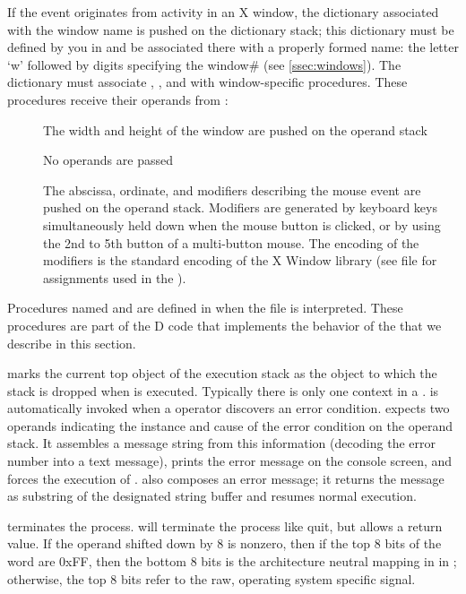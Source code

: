\noindent If the event originates from activity in an X window, the
dictionary associated with the window name is pushed on the dictionary
stack; this dictionary must be defined by you in  and be
associated there with a properly formed name: the letter `w' followed
by digits specifying the window\# (see \ref{ssec:windows}). The
dictionary must associate , , and
 with window-specific procedures. These procedures
receive their operands from :

\begin{description}
\item[] The width and height of the window are pushed
  on the operand stack
\item[] No operands are passed
\item[] The abscissa, ordinate, and modifiers
  describing the mouse event are pushed on the operand
  stack. Modifiers are generated by keyboard keys simultaneously held
  down when the mouse button is clicked, or by using the 2nd to 5th
  button of a multi-button mouse. The encoding of the modifiers is the
  standard encoding of the X Window library (see file
   for assignments used in the ).
\end{description}

Procedures named  and  are defined
in  when the file  is
interpreted. These procedures are part of the D code that implements
the behavior of the  that we describe in this section.

 marks the current top object of the execution stack as
the object to which the stack is dropped when  is
executed. Typically there is only one  context in a
.  is automatically invoked when a 
operator discovers an error condition.  expects two operands
indicating the instance and cause of the error condition on the
operand stack. It assembles a message string from this information
(decoding the error number into a text message), prints the error
message on the console screen, and forces the execution of
.  also composes an error message; it
returns the message as substring of the designated string buffer and
resumes normal execution.

 terminates the  process.  will terminate
the process like quit, but allows a return value. If the operand
shifted down by 8 is nonzero, then if the top 8 bits of the word are
0xFF, then the bottom 8 bits is the architecture neutral mapping in
 in ; otherwise, the top 8
bits refer to the raw, operating system specific signal.

